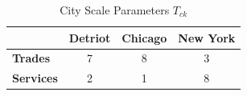 \documentclass[10pt]{article}
\begin{document}

\begin{table}[h]
    \centering
    \begin{tabular}{|l|c|c|c|}
        \hline
                          & \textbf{Detriot} & \textbf{Chicago} & \textbf{New York} \\
        \hline
        \textbf{Trades}   & 7                & 8                & 3                 \\
        \hline
        \textbf{Services} & 2                & 1                & 8                 \\
        \hline
    \end{tabular}
    \caption{City Scale Parameters $T_{ck}$}
    \label{city_shifter}
\end{table}
\end{document}
